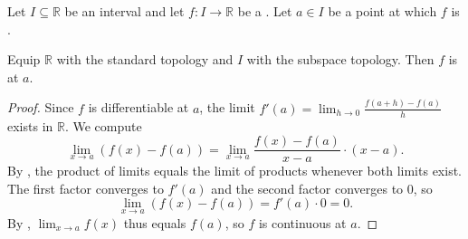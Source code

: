 \begin{proposition} \label{proposition:differentiability_implies_continuity_at_a_point}
    Let $I \subseteq \mathbb{R}$ be an interval and let $f : I \to \mathbb{R}$ be a . Let $a \in I$ be a point at which $f$ is .

    Equip $\mathbb{R}$ with the standard topology and $I$ with the subspace topology. Then $f$ is  at $a$.
\end{proposition}

\begin{proof}
    Since $f$ is differentiable at $a$, the limit $f'(a) = \lim_{h \to 0} \frac{f(a+h) - f(a)}{h}$ exists in $\mathbb{R}$. We compute
    $$\lim_{x \to a} (f(x) - f(a)) = \lim_{x \to a} \frac{f(x) - f(a)}{x - a} \cdot (x - a).$$
    By , the product of limits equals the limit of products whenever both limits exist. The first factor converges to $f'(a)$ and the second factor converges to $0$, so
    $$\lim_{x \to a} (f(x) - f(a)) = f'(a) \cdot 0 = 0.$$
    By , $\lim_{x \to a} f(x)$ thus equals $f(a)$, so $f$ is continuous at $a$.
\end{proof}

